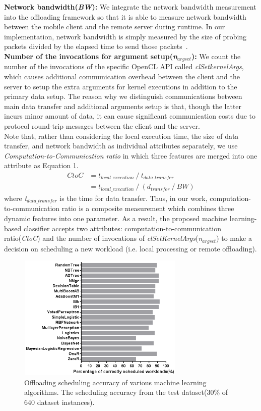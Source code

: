 \documentclass[10pt, conference, compsocconf]{IEEEtran}
\begin{document}
%
\textbf{Network bandwidth(\textit{BW}):} We integrate the network
bandwidth measurement into the offloading framework so that it is able
to measure network bandwidth between the mobile client and the
remote server during runtime.
%
In our implementation, network bandwidth is simply measured by the
size of probing packets divided by the elapsed time to send those
packets~\cite{bandwidth}.\\ 
%
\textbf{Number of the invocations for argument
setup(\textit{n$_{argset}$}):} We count the number of the invocations of
the specific OpenCL API called \textit{clSetkernelArgs}, which causes
additional communication overhead between the client and the server to
setup the extra arguments for kernel executions in addition to the
primary data setup.
%
The reason why we distinguish communications between main data transfer
and additional arguments setup is that, though the latter incurs minor
amount of data, it can cause significant communication costs due to
protocol round-trip messages between the client and the server.\\
%
\indent Note that, rather than considering the local execution time, the
size of data transfer, and network bandwidth as individual attributes
separately, we use \textit{Computation-to-Communication ratio} in which
three features are merged into one attribute as Equation 1. 
%
\begin{equation}
\begin{split}
	CtoC& = t_{local\_execution}\:/\: t_{data\_transfer} \\ 
        & = t_{local\_execution}\:/\:(d_{transfer}\:/\:BW)
\end{split}
\end{equation}
%
where \textit{t$_{data\_transfer}$} is the time for data transfer.
%
Thus, in our work, computation-to-communication ratio is a composite
measurement which combines three dynamic features into one parameter.
%
As a result, the proposed machine learning-based classifier accepts two
attributes:
computation-to-communication ratio(\textit{CtoC}) and the number of
invocations of \textit{clSetKernelArgs}(\textit{n$_{argset}$}) to make a
decision on scheduling a new workload (i.e. local processing or remote offloading).
%
\begin{figure}
\centering
\includegraphics[height=6.0cm, width=8.0cm]{Figure/figure4}
\caption{Offloading scheduling accuracy of various machine learning
algorithms.
% 
The scheduling accuracy from the test dataset(30\% of 640
dataset instances).}
\end{figure}
%
\end{document}
